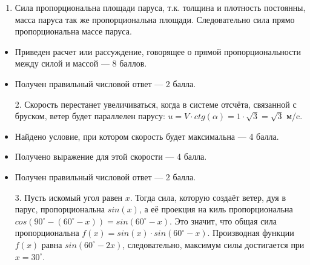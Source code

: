 \solutionSection

\begin{enumerate}
    \item Сила пропорциональна площади паруса, т.к. толщина и плотность постоянны, 
	масса паруса так же пропорциональна площади. Следовательно сила прямо пропорциональна массе паруса.

\end{enumerate}

\additionalCriteria

\begin{itemize}
    \item Приведен расчет или рассуждение, говорящее о прямой пропорциональности между силой и массой — 8 баллов.
    \item Получен правильный числовой ответ — 2 балла.
    
\end{itemize}

\begin{enumerate}
    \item[2.] Скорость перестанет увеличиваться, когда в системе отсчёта, связанной с бруском, ветер будет параллелен парусу: $u=V\cdot ctg(\alpha)=1\cdot \sqrt{3}= \sqrt{3}$ м/c.
    
\end{enumerate}

\additionalCriteria

\begin{itemize}
    \item Найдено условие, при котором скорость будет максимальна — 4 балла.
    \item Получено выражение для этой скорости — 4 балла.
    \item Получен правильный числовой ответ — 2 балла.
\end{itemize}

\begin{enumerate}
    \item[3.] Пусть искомый угол равен $x$. Тогда сила, которую создаёт ветер, дуя в парус, пропорциональна $sin(x)$, а её проекция на киль пропорциональна 
    \linebreak $cos(90^\circ - (60^\circ - x)) = sin(60^\circ - x)$. Это значит, что общая сила пропорциональна $f(x) = sin(x) \cdot sin(60^\circ - x)$. Производная функции $f(x)$ равна $sin(60^\circ - 2x)$, следовательно, максимум силы достигается при $x = 30^\circ$.
\end{enumerate}

